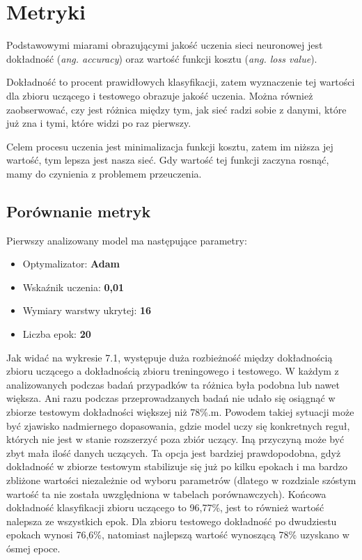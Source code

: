 \chapter{Metryki}
\label{cha:metryki}
Podstawowymi miarami obrazującymi jakość uczenia sieci neuronowej jest dokładność (\textit{ang. accuracy}) oraz wartość funkcji kosztu (\textit{ang. loss value}).

Dokładność to procent prawidłowych klasyfikacji, zatem wyznaczenie tej wartości dla zbioru uczącego i testowego obrazuje jakość uczenia. Można również zaobserwować, czy jest różnica między tym, jak sieć radzi sobie z danymi, które już zna i tymi, które widzi po raz pierwszy.

Celem procesu uczenia jest minimalizacja funkcji kosztu, zatem im niższa jej wartość, tym lepsza jest nasza sieć. Gdy wartość tej funkcji zaczyna rosnąć, mamy do czynienia z problemem przeuczenia.

\section{Porównanie metryk}
\label{cha:wyniki}
Pierwszy analizowany model ma następujące parametry:
\begin{itemize}
  \item Optymalizator: \textbf{Adam}
  \item Wskaźnik uczenia: \textbf{0,01}
  \item Wymiary warstwy ukrytej: \textbf{16}
  \item Liczba epok: \textbf{20}
 \end{itemize}
 
 Jak widać na wykresie 7.1, występuje duża rozbieżność między dokładnością zbioru uczącego a dokładnością zbioru treningowego i testowego. W każdym z analizowanych podczas badań przypadków ta różnica była podobna lub nawet większa. Ani razu podczas przeprowadzanych badań nie udało się osiągnąć w zbiorze testowym dokładności większej niż 78\%.m. Powodem takiej sytuacji może być zjawisko nadmiernego dopasowania, gdzie model uczy się konkretnych reguł, których nie jest w stanie rozszerzyć poza zbiór uczący. Iną przyczyną może być zbyt mała ilość danych uczących. Ta opcja jest bardziej prawdopodobna, gdyż dokładność w zbiorze testowym stabilizuje się już po kilku epokach i ma bardzo zbliżone wartości niezależnie od wyboru parametrów (dlatego w rozdziale szóstym wartość ta nie została uwzględniona w tabelach porównawczych). Końcowa dokładność klasyfikacji zbioru uczącego to 96,77\%, jest to również wartość nalepsza ze wszystkich epok. Dla zbioru testowego dokładność po dwudziestu epokach wynosi 76,6\%, natomiast najlepszą wartość wynoszącą 78\% uzyskano w ósmej epoce.
 

